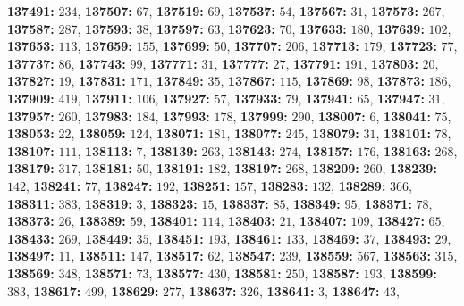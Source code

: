 \textsf{\bfseries 137491:} $234$, \textsf{\bfseries 137507:} $67$, \textsf{\bfseries 137519:} $69$, \textsf{\bfseries 137537:} $54$, \textsf{\bfseries 137567:} $31$, \textsf{\bfseries 137573:} $267$, \textsf{\bfseries 137587:} $287$, \textsf{\bfseries 137593:} $38$, \textsf{\bfseries 137597:} $63$, \textsf{\bfseries 137623:} $70$, \textsf{\bfseries 137633:} $180$, \textsf{\bfseries 137639:} $102$, \textsf{\bfseries 137653:} $113$, \textsf{\bfseries 137659:} $155$, \textsf{\bfseries 137699:} $50$, \textsf{\bfseries 137707:} $206$, \textsf{\bfseries 137713:} $179$, \textsf{\bfseries 137723:} $77$, \textsf{\bfseries 137737:} $86$, \textsf{\bfseries 137743:} $99$, \textsf{\bfseries 137771:} $31$, \textsf{\bfseries 137777:} $27$, \textsf{\bfseries 137791:} $191$, \textsf{\bfseries 137803:} $20$, \textsf{\bfseries 137827:} $19$, \textsf{\bfseries 137831:} $171$, \textsf{\bfseries 137849:} $35$, \textsf{\bfseries 137867:} $115$, \textsf{\bfseries 137869:} $98$, \textsf{\bfseries 137873:} $186$, \textsf{\bfseries 137909:} $419$, \textsf{\bfseries 137911:} $106$, \textsf{\bfseries 137927:} $57$, \textsf{\bfseries 137933:} $79$, \textsf{\bfseries 137941:} $65$, \textsf{\bfseries 137947:} $31$, \textsf{\bfseries 137957:} $260$, \textsf{\bfseries 137983:} $184$, \textsf{\bfseries 137993:} $178$, \textsf{\bfseries 137999:} $290$, \textsf{\bfseries 138007:} $6$, \textsf{\bfseries 138041:} $75$, \textsf{\bfseries 138053:} $22$, \textsf{\bfseries 138059:} $124$, \textsf{\bfseries 138071:} $181$, \textsf{\bfseries 138077:} $245$, \textsf{\bfseries 138079:} $31$, \textsf{\bfseries 138101:} $78$, \textsf{\bfseries 138107:} $111$, \textsf{\bfseries 138113:} $7$, \textsf{\bfseries 138139:} $263$, \textsf{\bfseries 138143:} $274$, \textsf{\bfseries 138157:} $176$, \textsf{\bfseries 138163:} $268$, \textsf{\bfseries 138179:} $317$, \textsf{\bfseries 138181:} $50$, \textsf{\bfseries 138191:} $182$, \textsf{\bfseries 138197:} $268$, \textsf{\bfseries 138209:} $260$, \textsf{\bfseries 138239:} $142$, \textsf{\bfseries 138241:} $77$, \textsf{\bfseries 138247:} $192$, \textsf{\bfseries 138251:} $157$, \textsf{\bfseries 138283:} $132$, \textsf{\bfseries 138289:} $366$, \textsf{\bfseries 138311:} $383$, \textsf{\bfseries 138319:} $3$, \textsf{\bfseries 138323:} $15$, \textsf{\bfseries 138337:} $85$, \textsf{\bfseries 138349:} $95$, \textsf{\bfseries 138371:} $78$, \textsf{\bfseries 138373:} $26$, \textsf{\bfseries 138389:} $59$, \textsf{\bfseries 138401:} $114$, \textsf{\bfseries 138403:} $21$, \textsf{\bfseries 138407:} $109$, \textsf{\bfseries 138427:} $65$, \textsf{\bfseries 138433:} $269$, \textsf{\bfseries 138449:} $35$, \textsf{\bfseries 138451:} $193$, \textsf{\bfseries 138461:} $133$, \textsf{\bfseries 138469:} $37$, \textsf{\bfseries 138493:} $29$, \textsf{\bfseries 138497:} $11$, \textsf{\bfseries 138511:} $147$, \textsf{\bfseries 138517:} $62$, \textsf{\bfseries 138547:} $239$, \textsf{\bfseries 138559:} $567$, \textsf{\bfseries 138563:} $315$, \textsf{\bfseries 138569:} $348$, \textsf{\bfseries 138571:} $73$, \textsf{\bfseries 138577:} $430$, \textsf{\bfseries 138581:} $250$, \textsf{\bfseries 138587:} $193$, \textsf{\bfseries 138599:} $383$, \textsf{\bfseries 138617:} $499$, \textsf{\bfseries 138629:} $277$, \textsf{\bfseries 138637:} $326$, \textsf{\bfseries 138641:} $3$, \textsf{\bfseries 138647:} $43$, 
